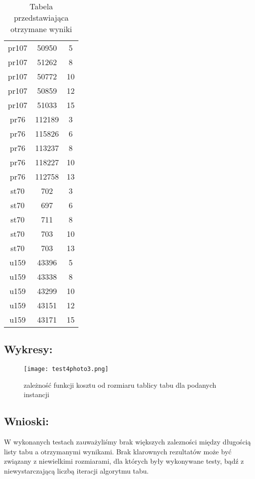 \begin{table}[H]
\begin{tabular}{||c c c||}
     pr107 & 50950 & 5 \\
     pr107 & 51262 & 8 \\
     pr107 & 50772 & 10 \\
     pr107 & 50859 & 12 \\
     pr107 & 51033 & 15 \\
     pr76 & 112189 & 3 \\
     pr76 & 115826 & 6 \\
     pr76 & 113237 & 8 \\
     pr76 & 118227 & 10 \\
     pr76 & 112758 & 13 \\
     st70 & 702 & 3 \\
     st70 & 697 & 6 \\ 
     st70 & 711 & 8 \\
     st70 & 703 & 10 \\
     st70 & 703 & 13 \\
     u159 & 43396 & 5 \\
     u159 & 43338 & 8 \\
     u159 & 43299 & 10 \\
     u159 & 43151 & 12 \\
     u159 & 43171 & 15\\
     \hline
    \end{tabular}
    \caption{Tabela przedstawiająca otrzymane wyniki}
    \end{table}
  \subsection{Wykresy: }
  \begin{figure}[H]
    \texttt{[image: test4photo3.png]}
    \centering
    \caption{zależność funkcji kosztu od rozmiaru tablicy tabu dla podanych instancji}
  \end{figure}
  \subsection{Wnioski: }
  W wykonanych testach zauważyliśmy brak większych zalezności między długością listy tabu a otrzymanymi wynikami. 
  Brak klarownych rezultatów może być związany z niewielkimi rozmiarami, dla których były wykonywane testy, bądź z niewystarczającą
  liczbą iteracji algorytmu tabu.
  
